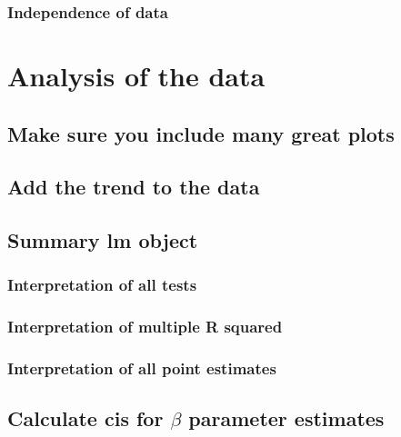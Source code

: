 \documentclass[]{article}
\begin{document}
\subsubsection{Independence of data}\label{independence-of-data}

\section{Analysis of the data}\label{analysis-of-the-data}

\subsection{Make sure you include many great
plots}\label{make-sure-you-include-many-great-plots}

\subsection{Add the trend to the data}\label{add-the-trend-to-the-data}

\subsection{Summary lm object}\label{summary-lm-object}

\subsubsection{Interpretation of all
tests}\label{interpretation-of-all-tests}

\subsubsection{Interpretation of multiple R
squared}\label{interpretation-of-multiple-r-squared}

\subsubsection{Interpretation of all point
estimates}\label{interpretation-of-all-point-estimates}

\subsection{\texorpdfstring{Calculate cis for \(\beta\) parameter
estimates}{Calculate cis for \textbackslash{}beta parameter estimates}}\label{calculate-cis-for-beta-parameter-estimates}
\end{document}
